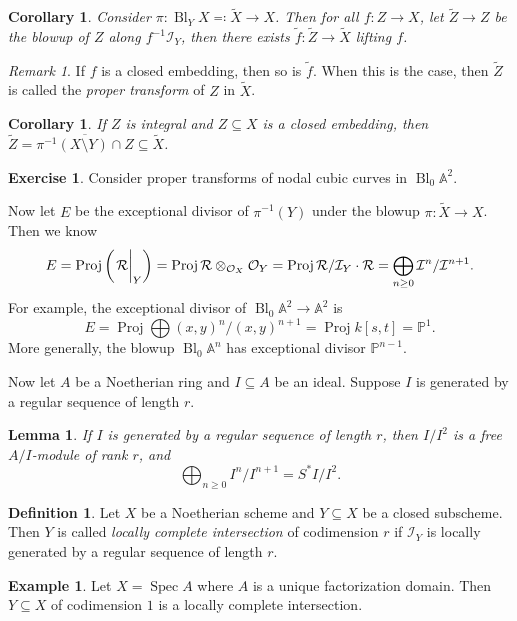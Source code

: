 \documentclass[leqno, openany]{memoir}
\newtheorem{cor}[thm]{Corollary}
\newtheorem{lem}[thm]{Lemma}
\theoremstyle{definition}
\newtheorem{defn}[thm]{Definition}
\newtheorem{exm}[thm]{Example}
\newtheorem{exer}[thm]{Exercise}
\theoremstyle{remark}
\newtheorem{rmk}[thm]{Remark}
\theoremstyle{plain}
\theoremstyle{definition}
\theoremstyle{remark}
\newcommand{\A}{\mathbb{A}}
\renewcommand{\P}{\mathbb{P}}
\newcommand{\mc}[1]{\mathcal{#1}}
\newcommand{\ol}[1]{\overline{#1}}
\newcommand{\wt}[1]{\widetilde{#1}}
\DeclareMathOperator{\Spec}{Spec}
\DeclareMathOperator{\Proj}{Proj}
\DeclareMathOperator{\Bl}{Bl}
\begin{document}
\begin{cor} Consider $\pi \colon \Bl_Y X \eqqcolon \wt{X} \to X$. Then for all
$f \colon Z \to X$, let $\wt{Z} \to Z$ be the blowup of $Z$ along $f^{-1}
\mc{I}_Y$, then there exists $\wt{f} \colon \wt{Z} \to \wt{X}$ lifting $f$.
\end{cor}

\begin{rmk} If $f$ is a closed embedding, then so is $\wt{f}$. When this is the
case, then $\wt{Z}$ is called the \textit{proper transform} of $Z$ in $\wt{X}$.
\end{rmk}

\begin{cor} If $Z$ is integral and $Z \subseteq X$ is a closed embedding, then
$\wt{Z} = \ol{\pi^{-1}(X \setminus Y) \cap Z} \subseteq \wt{X}$.  \end{cor}

\begin{exer} Consider proper transforms of nodal cubic curves in $\Bl_0 \A^2$.
\end{exer}

Now let $E$ be the exceptional divisor of $\pi^{-1}(Y)$ under the blowup $\pi
\colon \wt{X} \to X$. Then we know \[ E = \Proj \qty(\eval{\mc{R}}_Y) = \Proj
\mc{R} \otimes_{\mc{O}_X} \mc{O}_Y = \Proj \mc{R} / \mc{I}_Y \cdot \mc{R} =
\bigoplus_{n \geq 0} \mc{I}^n / \mc{I}^{n+1}. \] For example, the exceptional
divisor of $\Bl_0 \A^2 \to \A^2$ is \[ E = \Proj \bigoplus {(x,y)}^n /
{(x,y)}^{n+1} = \Proj k[s,t] = \P^1. \] More generally, the blowup $\Bl_0 \A^n$
has exceptional divisor $\P^{n-1}$.

Now let $A$ be a Noetherian ring and $I \subseteq A$ be an ideal. Suppose $I$
is generated by a regular sequence of length $r$.  \begin{lem} If $I$ is
    generated by a regular sequence of length $r$, then $I/I^2$ is a free
    $A/I$-module of rank $r$, and \[ \bigoplus_{n \geq 0} I^n / I^{n+1} = S^*
    I/I^2. \] \end{lem}

\begin{defn} Let $X$ be a Noetherian scheme and $Y \subseteq X$ be a closed
subscheme. Then $Y$ is called \textit{locally complete intersection} of
codimension $r$ if $\mc{I}_Y$ is locally generated by a regular sequence of
length $r$.  \end{defn}

\begin{exm} Let $X = \Spec A$ where $A$ is a unique factorization domain. Then
$Y \subseteq X$ of codimension $1$ is a locally complete intersection.
\end{exm}
\end{document}
